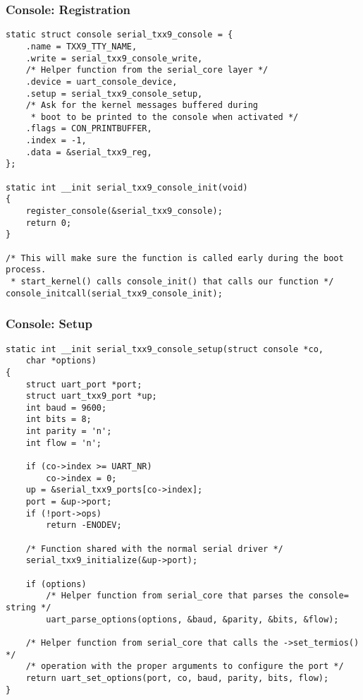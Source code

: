\begin{frame}[fragile]
  \frametitle{Console: Registration}
\begin{verbatim}
static struct console serial_txx9_console = {
    .name = TXX9_TTY_NAME,
    .write = serial_txx9_console_write,
    /* Helper function from the serial_core layer */
    .device = uart_console_device,
    .setup = serial_txx9_console_setup,
    /* Ask for the kernel messages buffered during
     * boot to be printed to the console when activated */
    .flags = CON_PRINTBUFFER,
    .index = -1,
    .data = &serial_txx9_reg,
};

static int __init serial_txx9_console_init(void)
{
    register_console(&serial_txx9_console);
    return 0;
}

/* This will make sure the function is called early during the boot process.
 * start_kernel() calls console_init() that calls our function */
console_initcall(serial_txx9_console_init);
\end{verbatim}
\end{frame}

\begin{frame}[fragile]
  \frametitle{Console: Setup}
\begin{verbatim}
static int __init serial_txx9_console_setup(struct console *co,
    char *options)
{
    struct uart_port *port;
    struct uart_txx9_port *up;
    int baud = 9600;
    int bits = 8;
    int parity = 'n';
    int flow = 'n';

    if (co->index >= UART_NR)
        co->index = 0;
    up = &serial_txx9_ports[co->index];
    port = &up->port;
    if (!port->ops)
        return -ENODEV;

    /* Function shared with the normal serial driver */
    serial_txx9_initialize(&up->port);
    
    if (options)
        /* Helper function from serial_core that parses the console= string */
        uart_parse_options(options, &baud, &parity, &bits, &flow);

    /* Helper function from serial_core that calls the ->set_termios() */
    /* operation with the proper arguments to configure the port */
    return uart_set_options(port, co, baud, parity, bits, flow);
}
\end{verbatim}
\end{frame}

